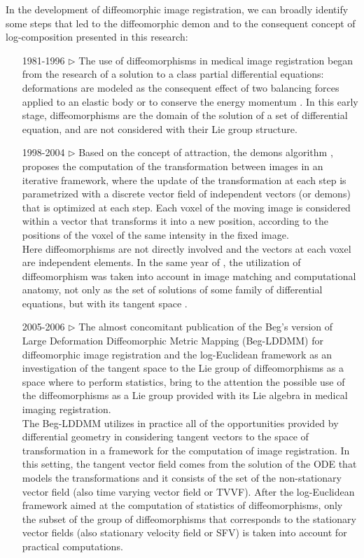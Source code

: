 In the development of diffeomorphic image registration, we can broadly identify some steps that led to the diffeomorphic demon and to the consequent concept of log-composition presented in this research:
\begin{enumerate}
	\item[1981-1996 $\triangleright$] The use of diffeomorphisms in medical image registration began from the research of a solution to a class partial differential equations: deformations are modeled as the consequent effect of two balancing forces applied to an elastic body \cite{Broit:1981} or to conserve the energy momentum \cite{christensen1996deformable}. In this early stage, diffeomorphisms are the domain of the solution of a set of differential equation, and are not considered with their Lie group structure.
	\item[1998-2004 $\triangleright$] Based on the concept of attraction, the demons algorithm \cite{thirion1998image}, \cite{pennec1999understanding} proposes the computation of the transformation between images in an iterative framework, where the update of the transformation at each step is parametrized with a discrete vector field of independent vectors (or demons) that is optimized at each step. Each voxel of the moving image is considered within a vector that transforms it into a new position, according to the positions of the voxel of the same intensity in the fixed image. \\
	Here diffeomorphisms are not directly involved and the vectors at each voxel are independent elements. 
	In the same year of \cite{thirion1998image}, the utilization of diffeomorphism was taken into account in image matching and computational anatomy, not only as the set of solutions of some family of differential equations, but with its tangent space \cite{Dupuis:98:variationalproblems,  trouve1998diffeomorphisms, grenander1998computational}.
	\item[2005-2006 $\triangleright$] The almost concomitant publication of the Beg's version of Large Deformation Diffeomorphic Metric Mapping (Beg-LDDMM) \cite{beg2005computing} for diffeomorphic image registration and the log-Euclidean framework \cite{arsigny2006statistics, Arsigny:MRM:06}  as an investigation of the tangent space to the Lie group of diffeomorphisms as a space where to perform statistics,
	bring to the attention the possible use of the diffeomorphisms as a Lie group provided with its Lie algebra in medical imaging registration.\\
	The Beg-LDDMM utilizes in practice all of the opportunities provided by differential geometry in considering tangent vectors to the space of transformation in a framework for the computation of image registration. In this setting, the tangent vector field comes from the solution of the ODE that models the transformations and it consists of the set of the non-stationary vector field (also time varying vector field or TVVF). After the log-Euclidean framework \cite{arsigny2006statistics} aimed at the computation of statistics of diffeomorphisms, only the subset of the group of diffeomorphisms that corresponds to the stationary vector fields (also stationary velocity field or SFV) is taken into account for practical computations.

\end{enumerate}
